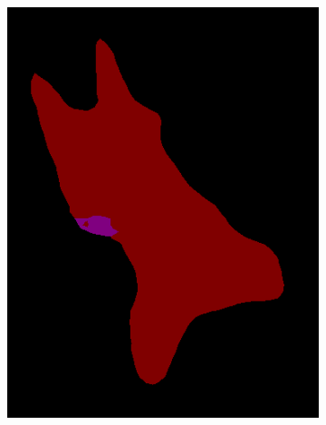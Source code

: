\documentclass{article} %
\begin{document}
\begin{figure}[t]
\begin{subfigure}[b]{0.19\linewidth}
    \includegraphics[width=\textwidth]{figs/ab/deeplab/2007_002619}
  \end{subfigure}
  \begin{subfigure}[b]{0.19\linewidth}

\end{subfigure}
\end{figure}
\end{document}
